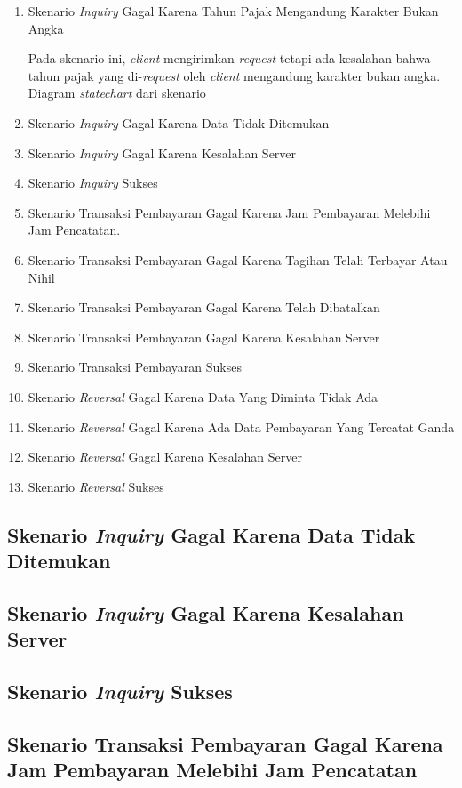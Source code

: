 \begin{enumerate}
  \item Skenario \textit{Inquiry} Gagal Karena Tahun Pajak Mengandung Karakter Bukan Angka
  
  Pada skenario ini, \textit{client} mengirimkan \textit{request} tetapi ada kesalahan bahwa tahun pajak yang di-\textit{request} oleh \textit{client} mengandung karakter bukan angka. Diagram \textit{statechart} dari skenario 
  
  \item Skenario \textit{Inquiry} Gagal Karena Data Tidak Ditemukan
  \item Skenario \textit{Inquiry} Gagal Karena Kesalahan Server
  \item Skenario \textit{Inquiry} Sukses
  \item Skenario Transaksi Pembayaran Gagal Karena Jam Pembayaran Melebihi Jam Pencatatan.
  \item Skenario Transaksi Pembayaran Gagal Karena Tagihan Telah Terbayar Atau Nihil
  \item Skenario Transaksi Pembayaran Gagal Karena Telah Dibatalkan
  \item Skenario Transaksi Pembayaran Gagal Karena Kesalahan Server
  \item Skenario Transaksi Pembayaran Sukses
  \item Skenario \textit{Reversal} Gagal Karena Data Yang Diminta Tidak Ada
  \item Skenario \textit{Reversal} Gagal Karena Ada Data Pembayaran Yang Tercatat Ganda
  \item Skenario \textit{Reversal} Gagal Karena Kesalahan Server
  \item Skenario \textit{Reversal} Sukses
\end{enumerate}

\subsection{Skenario \textit{Inquiry} Gagal Karena Data Tidak Ditemukan}
\subsection{Skenario \textit{Inquiry} Gagal Karena Kesalahan Server}
\subsection{Skenario \textit{Inquiry} Sukses}
\subsection{Skenario Transaksi Pembayaran Gagal Karena Jam Pembayaran Melebihi Jam Pencatatan}
